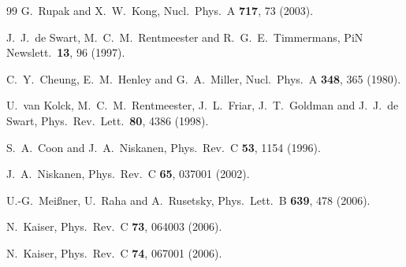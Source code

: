 \documentclass[aps,rmp,nofootinbib,twocolumn,floatfix]{revtex4}
\begin{document}
\begin{thebibliography}{99}
  G.~Rupak and X.~W.~Kong,
  Nucl.\ Phys.\  A {\bf 717}, 73 (2003).

  J.~J.~de Swart, M.~C.~M.~Rentmeester and R.~G.~E.~Timmermans,
  PiN Newslett.\  {\bf 13}, 96 (1997).

  C.~Y.~Cheung, E.~M.~Henley and G.~A.~Miller,
  Nucl.\ Phys.\  A {\bf 348}, 365 (1980).

  U.~van Kolck, M.~C.~M.~Rentmeester, J.~L.~Friar, J.~T.~Goldman and J.~J.~de Swart,
  Phys.\ Rev.\ Lett.\  {\bf 80}, 4386 (1998).


  S.~A.~Coon and J.~A.~Niskanen,
  Phys.\ Rev.\  C {\bf 53}, 1154 (1996).

  J.~A.~Niskanen,
  Phys.\ Rev.\  C {\bf 65}, 037001 (2002).

  U.-G.~Mei\ss ner, U.~Raha and A.~Rusetsky,
  Phys.\ Lett.\  B {\bf 639}, 478 (2006).

  N.~Kaiser,
  Phys.\ Rev.\  C {\bf 73}, 064003 (2006).

  N.~Kaiser,
  Phys.\ Rev.\  C {\bf 74}, 067001 (2006).


\end{thebibliography}
\end{document}
